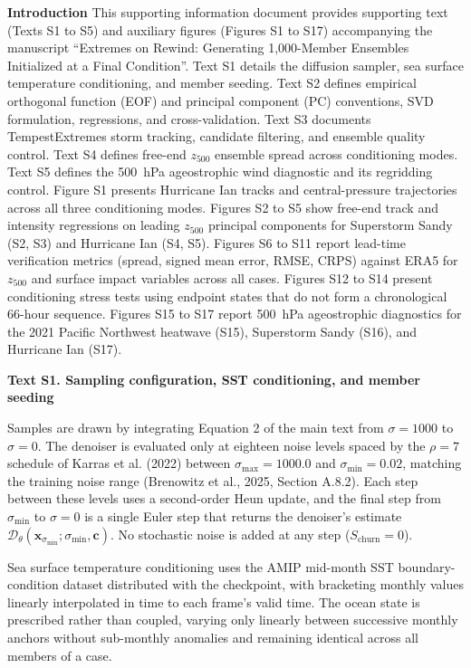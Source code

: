 \noindent\textbf{Introduction}
This supporting information document provides supporting text (Texts S1 to S5) and auxiliary figures (Figures S1 to S17) accompanying the manuscript ``Extremes on Rewind: Generating 1,000-Member Ensembles Initialized at a Final Condition''. Text S1 details the diffusion sampler, sea surface temperature conditioning, and member seeding. Text S2 defines empirical orthogonal function (EOF) and principal component (PC) conventions, SVD formulation, regressions, and cross-validation. Text S3 documents TempestExtremes storm tracking, candidate filtering, and ensemble quality control. Text S4 defines free-end $z_{500}$ ensemble spread across conditioning modes. Text S5 defines the 500~hPa ageostrophic wind diagnostic and its regridding control. Figure S1 presents Hurricane Ian tracks and central-pressure trajectories across all three conditioning modes. Figures S2 to S5 show free-end track and intensity regressions on leading $z_{500}$ principal components for Superstorm Sandy (S2, S3) and Hurricane Ian (S4, S5). Figures S6 to S11 report lead-time verification metrics (spread, signed mean error, RMSE, CRPS) against ERA5 for $z_{500}$ and surface impact variables across all cases. Figures S12 to S14 present conditioning stress tests using endpoint states that do not form a chronological 66-hour sequence. Figures S15 to S17 report 500~hPa ageostrophic diagnostics for the 2021 Pacific Northwest heatwave (S15), Superstorm Sandy (S16), and Hurricane Ian (S17).

\noindent\textbf{Text S1. Sampling configuration, SST conditioning, and member seeding}

Samples are drawn by integrating Equation 2 of the main text from $\sigma = 1000$ to $\sigma = 0$. The denoiser is evaluated only at eighteen noise levels spaced by the $\rho = 7$ schedule of Karras et al. (2022) between $\sigma_{\max} = 1000.0$ and $\sigma_{\min} = 0.02$, matching the training noise range (Brenowitz et al., 2025, Section A.8.2). Each step between these levels uses a second-order Heun update, and the final step from $\sigma_{\min}$ to $\sigma = 0$ is a single Euler step that returns the denoiser's estimate $\mathcal{D}_\theta(\mathbf{x}_{\sigma_{\min}}; \sigma_{\min}, \mathbf{c})$. No stochastic noise is added at any step ($S_{\text{churn}} = 0$).

Sea surface temperature conditioning uses the AMIP mid-month SST boundary-condition dataset distributed with the checkpoint, with bracketing monthly values linearly interpolated in time to each frame's valid time. The ocean state is prescribed rather than coupled, varying only linearly between successive monthly anchors without sub-monthly anomalies and remaining identical across all members of a case.

